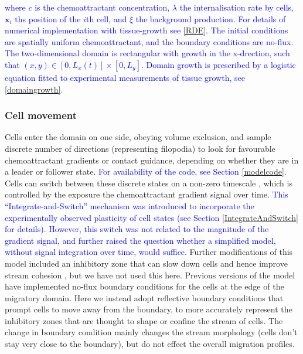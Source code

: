 \documentclass[review]{elsarticle}
\newcommand\hl[1]{{\textcolor{blue}{#1}}}
\begin{document}
\hl{where $c$ is the chemoattractant concentration, $\lambda$ the internalisation rate by cells, $\mathbf{x}_i$ ths position of the $i$th cell, and $\xi$ the background production. For details of numerical implementation with tissue-growth see \eqref{RDE}. The initial conditions are spatially uniform chemoattractant, and the boundary conditions are no-flux. The two-dimensional domain is rectangular with growth in the x-drection, such that $(x,y) \in [0, L_x(t)]\times[0, L_y]$. Domain growth is prescribed by a logistic equation fitted to experimental measurements of tissue growth, see \eqref{domaingrowth}}.

\subsubsection{Cell movement\label{methodsABM}}
Cells enter the domain on one side, obeying volume exclusion, and sample discrete number of directions (representing filopodia) to look for favourable chemoattractant gradients or contact guidance, depending on whether they are in a leader or follower state. \hl{ For availability of the code, see Section \ref{modelcode}.} Cells can switch between these discrete states on a non-zero timescale \cite{McLennan2015b}, which is controlled by the exposure the chemoattractant gradient signal over time. \hl{This ``Integrate-and-Switch'' mechanism {\cite{McLennan2015b}} was introduced to incorporate the experimentally observed plasticity of cell states (see Section \ref{IntegrateAndSwitch} for details). However, this switch was not related to the magnitude of the gradient signal, and further raised the question whether a simplified model, without signal integration over time, would suffice.} Further modifications of this model included an inhibitory zone that can slow down cells and hence improve stream cohesion \cite{McLennan2017}, but we have not used this here. Previous versions of the model have implemented no-flux boundary conditions for the cells at the edge of the migratory domain. Here we instead adopt reflective boundary conditions that prompt cells to move away from the boundary, to more accurately represent the inhibitory zones \cite{Kulesa2010,Szabo2016a} that are thought to shape or confine the stream of cells. The change in boundary condition mainly changes the stream morphology (cells don't stay very close to the boundary), but do not effect the overall migration profiles.

\end{document}
